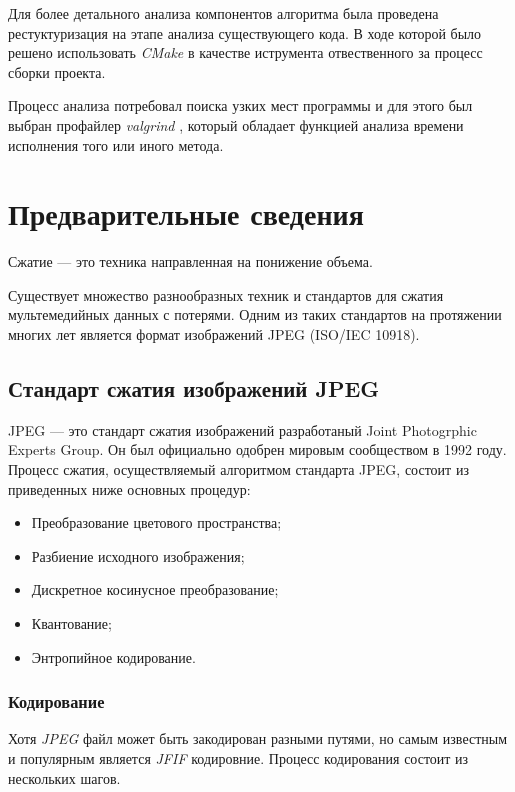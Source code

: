 \documentclass{matmex-diploma-custom}
\begin{document}
Для  более детального анализа компонентов алгоритма была проведена рестуктуризация на этапе анализа существующего кода. В ходе которой было решено использовать \emph{CMake}\cite{offical-cmake} в качестве иструмента отвественного за процесс сборки проекта.

Процесс анализа потребовал поиска узких мест программы и для этого был выбран профайлер \emph{valgrind} \cite{offical-valgrind}, который обладает функцией анализа времени исполнения того или иного метода.  

\section{Предварительные сведения}
Сжатие --- это техника направленная на понижение объема.

Существует множество разнообразных  техник и стандартов для сжатия мультемедийных данных с потерями.
 Одним из таких стандартов на протяжении многих лет является формат изображений JPEG (ISO/IEC 10918)\cite{jpeg-spec}.

\subsection{Стандарт сжатия изображений JPEG}
JPEG --- это стандарт сжатия изображений разработаный Joint Photogrphic Experts Group. Он был официально одобрен мировым сообществом в 1992 году. %
  Процесс сжатия, осуществляемый алгоритмом стандарта JPEG, состоит из приведенных ниже основных процедур:
        \begin{itemize}
            \item{Преобразование цветового пространства;}
            \item{Разбиение исходного изображения;}
            \item{Дискретное косинусное преобразование;}
            \item{Квантование;}
            \item{Энтропийное кодирование.}
        \end{itemize}

\subsubsection{Кодирование}
Хотя \emph{JPEG} файл может быть закодирован разными путями, но самым известным и популярным является \emph{JFIF} кодировние.
Процесс кодирования состоит из нескольких шагов.\\
\end{document}
